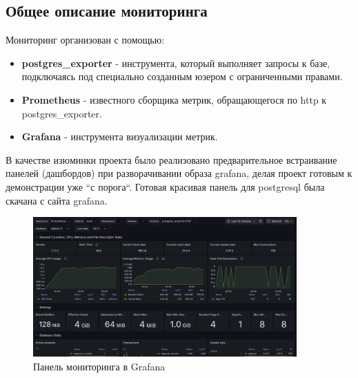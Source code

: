 \subsection{Общее описание мониторинга}\label{subsec:monitoringall}
Мониторинг организован с помощью:

\begin{itemize}
    \item \textbf{postgres\_exporter} - инструмента, который выполняет запросы к базе, подключаясь под
    специально созданным юзером с ограниченными правами.
    \item \textbf{Prometheus} - известного сборщика метрик, обращающегося по http к postgres\_exporter.
    \item \textbf{Grafana} - инструмента визуализации метрик.
\end{itemize}

В качестве изюминки проекта было реализовано предварительное встраивание панелей (дашбордов)
при разворачивании образа grafana, делая проект готовым к демонстрации уже ``с порога``.
Готовая красивая панель для postgresql была скачана с сайта grafana.

\begin{figure}[htbp]
    \centering
    \includegraphics[width=0.9\textwidth]{grafana} %
    \caption{Панель мониторинга в Grafana}\label{fig:grafanapic}
\end{figure}
